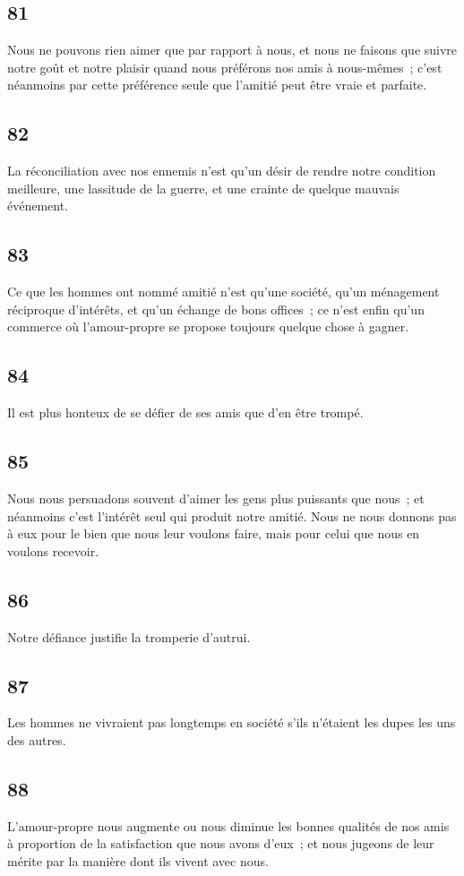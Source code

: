 \documentclass[french,twoside]{book} %
\begin{document}
\subsection[{81}]{ \textsc{81} }
\noindent Nous ne pouvons rien aimer que par rapport à nous, et nous ne faisons que suivre notre goût et notre plaisir quand nous préférons nos amis à nous-mêmes ; c’est néanmoins par cette préférence seule que l’amitié peut être vraie et parfaite.
\subsection[{82}]{ \textsc{82} }
\noindent La réconciliation avec nos ennemis n’est qu’un désir de rendre notre condition meilleure, une lassitude de la guerre, et une crainte de quelque mauvais événement.
\subsection[{83}]{ \textsc{83} }
\noindent Ce que les hommes ont nommé amitié n’est qu’une société, qu’un ménagement réciproque d’intérêts, et qu’un échange de bons offices ; ce n’est enfin qu’un commerce où l’amour-propre se propose toujours quelque chose à gagner.
\subsection[{84}]{ \textsc{84} }
\noindent Il est plus honteux de se défier de ses amis que d’en être trompé.
\subsection[{85}]{ \textsc{85} }
\noindent Nous nous persuadons souvent d’aimer les gens plus puissants que nous ; et néanmoins c’est l’intérêt seul qui produit notre amitié. Nous ne nous donnons pas à eux pour le bien que nous leur voulons faire, mais pour celui que nous en voulons recevoir.
\subsection[{86}]{ \textsc{86} }
\noindent Notre défiance justifie la tromperie d’autrui.
\subsection[{87}]{ \textsc{87} }
\noindent Les hommes ne vivraient pas longtemps en société s’ils n’étaient les dupes les uns des autres.
\subsection[{88}]{ \textsc{88} }
\noindent L’amour-propre nous augmente ou nous diminue les bonnes qualités de nos amis à proportion de la satisfaction que nous avons d’eux ; et nous jugeons de leur mérite par la manière dont ils vivent avec nous.
\end{document}
